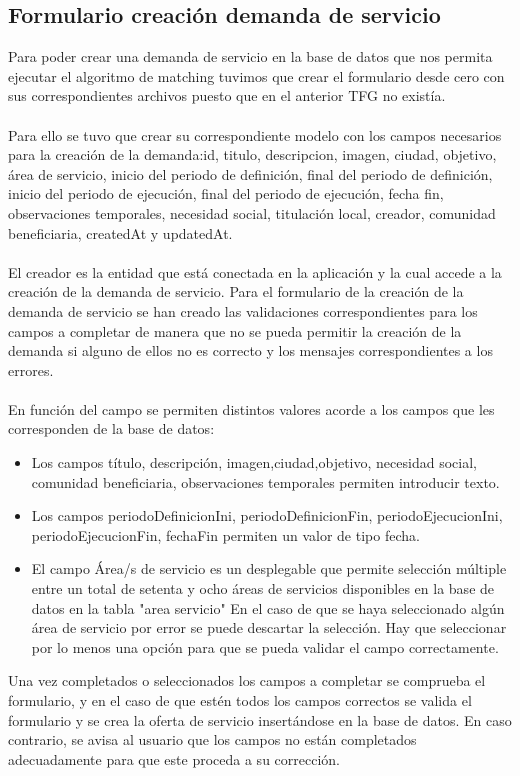 \documentclass[11pt]{article}
\begin{document}
\subsection{Formulario creación demanda de servicio}
Para poder crear una demanda de servicio en la base de datos que nos permita ejecutar el algoritmo de matching tuvimos que crear el formulario desde cero con sus correspondientes archivos puesto que en el anterior TFG no existía.\\\\
Para ello se tuvo que crear su correspondiente modelo con los campos necesarios para la creación de la demanda:id, titulo, descripcion, imagen, ciudad, objetivo, área de servicio, inicio del periodo de definición, final del periodo de definición, inicio del periodo de ejecución, final del periodo de ejecución, fecha fin, observaciones temporales, necesidad social, titulación local, creador, comunidad beneficiaria, createdAt y updatedAt.\\\\
El creador es la entidad que está conectada en la aplicación y la cual accede a la creación de la demanda de servicio.
Para el formulario de la creación de la demanda de servicio se han creado las validaciones correspondientes para los campos a completar de manera que no se pueda permitir la creación de la demanda si alguno de ellos no es correcto y los mensajes correspondientes a los errores.\\\\
En función del campo se permiten distintos valores acorde a los campos que les corresponden de la base de datos: \\
\begin{itemize} 
	\item Los campos título, descripción, imagen,ciudad,objetivo, necesidad social, comunidad beneficiaria, observaciones temporales permiten introducir texto. 
	\item  Los campos periodoDefinicionIni, periodoDefinicionFin, periodoEjecucionIni, periodoEjecucionFin, fechaFin permiten un valor de tipo fecha.
	\item El campo Área/s de servicio es un desplegable que permite selección múltiple entre un total de setenta y ocho áreas de servicios disponibles en la base de datos en la tabla "area servicio" En el caso de que se haya seleccionado algún área de servicio por error se puede descartar la selección. Hay que seleccionar por lo menos una opción para que se pueda validar el campo correctamente.
\end{itemize}
Una vez completados o seleccionados los campos a completar se comprueba el formulario, y en el caso de que estén todos los campos correctos se valida el formulario y se crea la oferta de servicio insertándose en la base de datos. En caso contrario, se avisa al usuario que los campos no están completados adecuadamente para que este proceda a su corrección.\\\\
\end{document}
